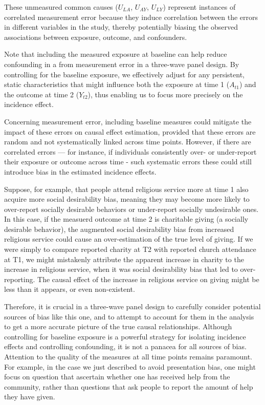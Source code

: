 \documentclass[
  singlecolumn]{report}
\begin{document}
These unmeasured common causes (\(U_{LA}\), \(U_{AY}\), \(U_{LY}\))
represent instances of correlated measurement error because they induce
correlation between the errors in different variables in the study,
thereby potentially biasing the observed associations between exposure,
outcome, and confounders.

Note that including the measured exposure at baseline can help reduce
confounding in a from measurement error in a three-wave panel design. By
controlling for the baseline exposure, we effectively adjust for any
persistent, static characteristics that might influence both the
exposure at time 1 (\(A_{t1}\)) and the outcome at time 2 (\(Y_{t2}\)),
thus enabling us to focus more precisely on the incidence effect.

Concerning measurement error, including baseline measures could mitigate
the impact of these errors on causal effect estimation, provided that
these errors are random and not systematically linked across time
points. However, if there are correlated errors --- for instance, if
individuals consistently over- or under-report their exposure or outcome
across time - such systematic errors these could still introduce bias in
the estimated incidence effects.

Suppose, for example, that people attend religious service more at time
1 also acquire more social desirability bias, meaning they may become
more likely to over-report socially desirable behaviors or under-report
socially undesirable ones. In this case, if the measuerd outcome at time
2 is charitable giving (a socially desirable behavior), the augmented
social desirability bias from increased religious service could cause an
over-estimation of the true level of giving. If we were simply to
compare reported charity at T2 with reported church attendance at T1, we
might mistakenly attribute the apparent increase in charity to the
increase in religious service, when it was social desirability bias that
led to over-reporting. The causal effect of the increase in religious
service on giving might be less than it appears, or even non-existent.

Therefore, it is crucial in a three-wave panel design to carefully
consider potential sources of bias like this one, and to attempt to
account for them in the analysis to get a more accurate picture of the
true causal relationships. Although controlling for baseline exposure is
a powerful strategy for isolating incidence effects and controlling
confounding, it is not a panacea for all sources of bias. Attention to
the quality of the measures at all time points remains paramount. For
example, in the case we just described to avoid presentation bias, one
might focus on question that ascertain whether one has received help
from the community, rather than questions that ask people to report the
amount of help they have given.
\end{document}

